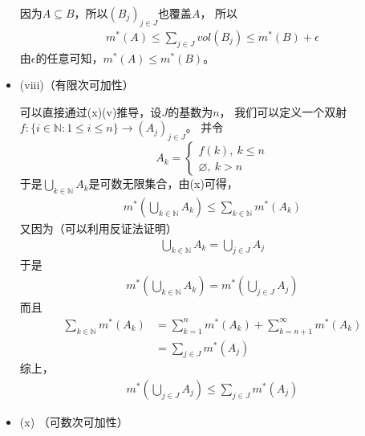 \documentclass{article}
\begin{document}
\begin{itemize}
        因为$A \subseteq B$，所以$(B_j)_{j \in J}$也覆盖$A$，
        所以
        \begin{align*}
          m^{\ast}(A) \leq \sum\limits_{j \in J} vol(B_j) \leq m^{\ast}(B) + \epsilon
        \end{align*}
        由$\epsilon$的任意可知，$m^{\ast}(A) \leq m^{\ast}(B)$。

  \item (viii)（有限次可加性）

        可以直接通过(x)(v)推导，设$J$的基数为$n$，
        我们可以定义一个双射$f: \{i \in \mathbb{N}: 1 \leq i \leq n \} \to (A_j)_{j \in J}$。
        并令
        \begin{equation*}
          A_k =
          \begin{cases*}
            f(k), \  k \leq n \\
            \varnothing, \  k > n
          \end{cases*}
        \end{equation*}
        于是$\bigcup\limits_{k \in \mathbb{N}} A_k$是可数无限集合，由(x)可得，
        \begin{align*}
          m^{\ast}(\bigcup\limits_{k \in \mathbb{N}} A_k)  \leq  \sum \limits_{k \in \mathbb{N}} m^{\ast}(A_k)
        \end{align*}
        又因为（可以利用反证法证明）
        \begin{align*}
          \bigcup\limits_{k \in \mathbb{N}} A_k = \bigcup\limits_{j \in J} A_j
        \end{align*}
        于是
        \begin{align*}
          m^{\ast}(\bigcup\limits_{k \in \mathbb{N}} A_k) = m^{\ast}(\bigcup\limits_{j \in J} A_j)
        \end{align*}
        而且
        \begin{align*}
          \sum \limits_{k \in \mathbb{N}} m^{\ast}(A_k) & = \sum \limits_{k = 1}^n m^{\ast}(A_k) + \sum \limits_{k = n + 1}^\infty m^{\ast}(A_k) \\
                                                        & = \sum \limits_{j \in J} m^{\ast}(A_j)
        \end{align*}
        综上，
        \begin{align*}
          m^{\ast}(\bigcup\limits_{j \in J} A_j) \leq \sum \limits_{j \in J} m^{\ast}(A_j)
        \end{align*}


  \item (x) （可数次可加性）


\end{itemize}
\end{document}
